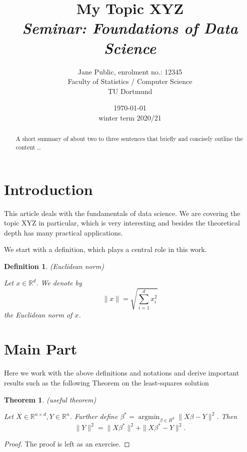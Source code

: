 \documentclass[a4paper,12pt]{article}
\title{My Topic XYZ\\
	\emph{Seminar: Foundations of Data Science}}
\author{%
	Jane Public, enrolment no.: 12345\\
	Faculty of Statistics / Computer Science\\
	TU Dortmund
	}
\date{\today\\%
	winter term 
	2020/21}
\newtheorem{theorem}{Theorem}
\newtheorem{definition}{Definition}
\begin{document}
\maketitle
\linenumbers
\begin{abstract}
A short summary of about two to three sentences that briefly and concisely outline the content \ldots
\end{abstract}

\section{%
		Introduction}
This article deals with the fundamentals of data science. We are covering the topic XYZ in particular, which is very interesting and besides the theoretical depth has many practical applications.


We start with a definition, which plays a central role in this work.
\begin{definition}{%
				(Euclidean norm)}
\begin{linenomath*}
	Let $x\in\mathbb{R}^d$. We denote by $$\|x\|=\sqrt{\sum_{i=1}^{d} x_i^2}$$ the Euclidean norm of $x$.
\end{linenomath*}
\end{definition}
	
\section{%
	Main Part}
\label{main_part}
Here we work with the above definitions and notations and derive important results such as the following Theorem on the least-squares solution
\begin{theorem}{%
		(useful theorem)}
\label{thm:main}
\begin{linenomath*}
	Let $X\in\mathbb{R}^{n\times d}, Y\in\mathbb{R}^n$. Further define $\beta^* = \operatorname{argmin}_{\beta\in R^d}\|X\beta-Y\|^2$. Then $$\|Y\|^2=\|X\beta^*\|^2 + \|X\beta^* - Y\|^2.$$
\end{linenomath*}
\end{theorem}
\begin{proof}
	The proof is left as an exercise.
\end{proof}
\end{document}
